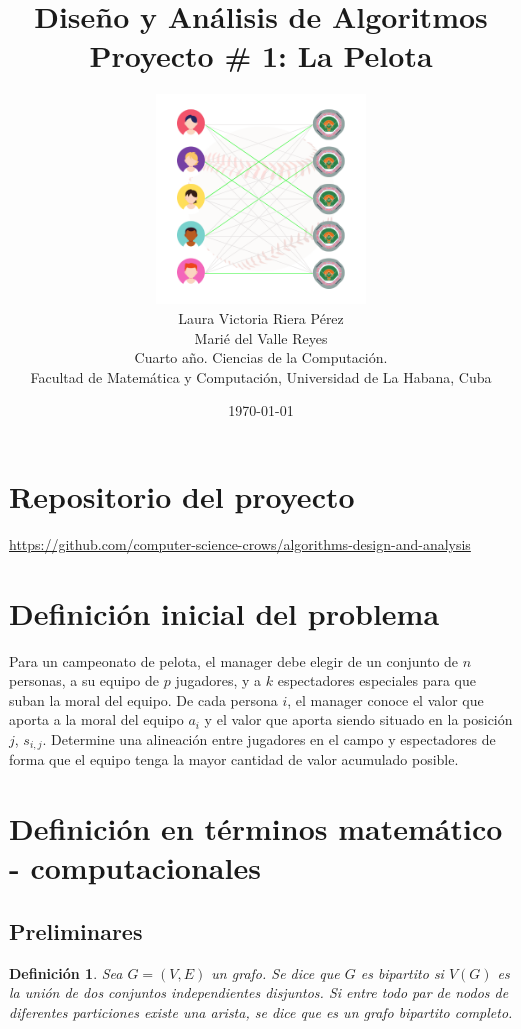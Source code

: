 \documentclass[10pt]{article} %
\title{\normalsize{Dise\~no y An\'alisis de Algoritmos }\\
	\Huge\bfseries Proyecto \# 1: La Pelota \\
} %
\author{%
	\includegraphics[width=15em]{logo.png}\\
	Laura Victoria Riera P\'erez\\
	Mari\'e del Valle Reyes \vspace{1em} \\
	\small Cuarto a\~no. Ciencias de la Computaci\'on. \\ %
	\small Facultad de Matem\'atica y Computaci\'on, Universidad de La Habana, Cuba \\ %
}
\date{\footnotesize \today } %
\newtheorem{mydef}{Definici\'on}%
\begin{document}
	\maketitle
	
	
	\section{Repositorio del proyecto}
	
	\begin{center}
		\href{https://github.com/computer-science-crows/algorithms-design-and-analysis}{https://github.com/computer-science-crows/algorithms-design-and-analysis}
	\end{center}

	\section{Definici\'on inicial del problema} 
	
	Para un campeonato de pelota, el manager debe elegir de un conjunto de $ n $ personas, a su equipo de $ p $ jugadores, y a $ k $ espectadores especiales para que suban la moral del equipo.
	De cada persona $ i $, el manager conoce el valor que aporta a la moral del equipo $ a_i $ y el valor que aporta siendo situado en la posici\'on $ j $, $ s_{i,j} $. 
	Determine una alineación entre jugadores en el campo y espectadores de forma que el equipo tenga la mayor cantidad de valor acumulado posible.
	
	\section{Definici\'on en t\'erminos matem\'atico - computacionales}
	
	\subsection{Preliminares}
	
	\begin{mydef}
		Sea $ G= (V,E) $ un grafo. Se dice que $ G $ es bipartito si $ V(G) $ es la uni\'on de dos conjuntos independientes disjuntos. Si entre todo par de nodos de diferentes particiones existe una arista, se dice que es un grafo bipartito completo.
	\end{mydef}
	
\end{document}

